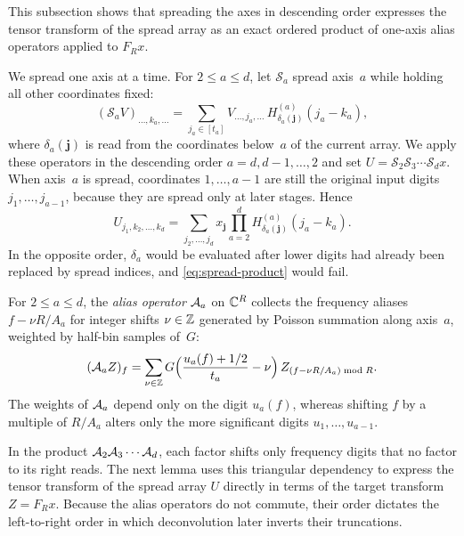 This subsection shows that spreading the axes in descending order expresses the tensor transform of the spread array as
an exact ordered product of one-axis alias operators applied to $F_R x$.

We spread one axis at a time. For $2\le a\le d$, let $\mathcal S_a$ spread axis~$a$ while holding all other coordinates
fixed:
\begin{equation}\label{eq:spread-axis}
  (\mathcal S_a V)_{\dots,k_a,\dots}=\sum_{j_a\in[t_a]}V_{\dots,j_a,\dots}\,H^{(a)}_{\delta_a(\mathbf j)}(j_a-k_a),
\end{equation}
where $\delta_a(\mathbf j)$ is read from the coordinates below~$a$ of the current array. We apply these operators in the
descending order $a=d,d-1,\dots,2$ and set $U=\mathcal S_2\mathcal S_3\cdots\mathcal S_d x$. When axis~$a$ is spread,
coordinates $1,\dots,a-1$ are still the original input digits $j_1,\dots,j_{a-1}$, because they are spread only at later
stages. Hence
\begin{equation}\label{eq:spread-product}
  U_{j_1,k_2,\dots,k_d}=\sum_{j_2,\dots,j_d}x_{\mathbf j}\prod_{a=2}^d H^{(a)}_{\delta_a(\mathbf j)}(j_a-k_a).
\end{equation}
In the opposite order, $\delta_a$ would be evaluated after lower digits had already been replaced by spread indices, and
\eqref{eq:spread-product} would fail.

For $2\le a\le d$, the \emph{alias operator} $\mathcal{A}_a$ on $\mathbb{C}^R$ collects the frequency aliases $f-\nu R/A_a$ for integer
shifts $\nu\in\mathbb{Z}$ generated by Poisson summation along axis~$a$, weighted by half-bin samples of~$G$:
\begin{equation}\label{eq:alias-op}
  (\mathcal{A}_a Z)_f=\sum_{\nu\in\mathbb{Z}}G\Bigl(\frac{u_a(f)+1/2}{t_a}-\nu\Bigr)\,Z_{(f-\nu R/A_a)\bmod R}.
\end{equation}
The weights of $\mathcal{A}_a$ depend only on the digit $u_a(f)$, whereas shifting $f$ by a multiple of $R/A_a$ alters only the
more significant digits $u_1,\dots,u_{a-1}$.

In the product $\mathcal{A}_2\mathcal{A}_3\cdots\mathcal{A}_d$, each factor shifts only frequency digits that no factor to its right reads. The
next lemma uses this triangular dependency to express the tensor transform of the spread array $U$ directly in terms of
the target transform $Z=F_R x$. Because the alias operators do not commute, their order dictates the left-to-right order
in which deconvolution later inverts their truncations.

